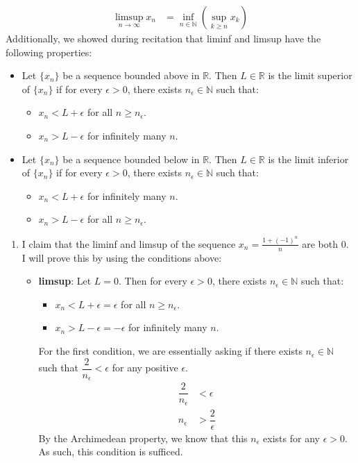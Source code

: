 \documentclass{article}%
\begin{document}
\begin{enumerate}
\begin{align*}
        \limsup_{n\to\infty}x_n &= \inf_{n \in \mathbb{N}}\left(\sup_{k\geq n}x_k\right)
    \end{align*}
    Additionally, we showed during recitation that liminf and limsup have the following properties:
    \begin{itemize}
        \item Let $\{x_n\}$ be a sequence bounded above in $\mathbb{R}$. Then $L \in \mathbb{R}$ is the limit superior of $\{x_n\}$ if for every $\epsilon > 0$, there exists $n_\epsilon \in \mathbb{N}$ such that:
        \begin{itemize}
            \item $x_n < L + \epsilon$ for all $n \geq n_\epsilon$.
            \item $ x_n > L - \epsilon$ for infinitely many $n$.
        \end{itemize}
        \item Let $\{x_n\}$ be a sequence bounded below in $\mathbb{R}$. Then $L \in \mathbb{R}$ is the limit inferior of $\{x_n\}$ if for every $\epsilon > 0$, there exists $n_\epsilon \in \mathbb{N}$ such that:
        \begin{itemize}
            \item $x_n < L + \epsilon$ for infinitely many $n$.
            \item $x_n > L - \epsilon$ for all $n \geq n_\epsilon$.
        \end{itemize}
    \end{itemize}
    \begin{enumerate}
        \item I claim that the liminf and limsup of the sequence $x_n = \frac{1+(-1)^n}{n}$ are both 0. I will prove this by using the conditions above:
        \begin{itemize}
            \item \textbf{limsup}: Let $L = 0$. Then for every $\epsilon > 0$, there exists $n_\epsilon \in \mathbb{N}$ such that:
            \begin{itemize}
                \item $x_n < L + \epsilon = \epsilon$ for all $n \geq n_\epsilon$.
                \item $x_n > L - \epsilon = -\epsilon$ for infinitely many $n$.
            \end{itemize}
            For the first condition, we are essentially asking if there exists $n_\epsilon \in \mathbb{N}$ such that $\dfrac{2}{n_\epsilon} < \epsilon$ for any positive $\epsilon$. 
            \begin{align*}
                \dfrac{2}{n_\epsilon} &< \epsilon\\
                n_\epsilon &> \dfrac{2}{\epsilon}
            \end{align*}
            By the Archimedean property, we know that this $n_\epsilon$ exists for any $\epsilon > 0$. As such, this condition is sufficed.


\end{itemize}
\end{enumerate}
\end{enumerate}
\end{document}

